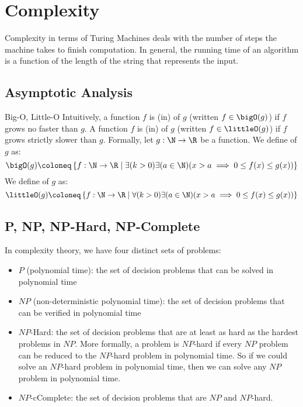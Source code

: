 \chapter{Complexity}

Complexity in terms of Turing Machines deals with the number of steps the machine takes to finish computation. In general, the running time of an algorithm is a function of the length of the string that represents the input.

\section{Asymptotic Analysis}

\begin{dfnbox}{Big-O, Little-O}{}
    Intuitively, a function $f$ is (in)  of $g$ (written $f \in \bigO(g)$) if $f$ grows no faster than $g$. A function $f$ is (in)  of $g$ (written $f \in \littleO(g)$) if $f$ grows strictly slower than $g$.
    \tcblower
    Formally, let $g : \N \to \R$ be a function. We define  of $g$ as:
    \[ \bigO(g) \coloneq \left\{ f : \N \to \R \mid \exists (k > 0) \exists (a \in \N) (x > a \implies 0 \leq f(x) \leq g(x)) \right\} \]
    We define  of $g$ as:
    \[ \littleO(g) \coloneq \left\{ f : \N \to \R \mid \forall (k > 0) \exists (a \in \N) (x > a \implies 0 \leq f(x) \leq g(x)) \right\} \]
\end{dfnbox}

\section{P, NP, NP-Hard, NP-Complete}

In complexity theory, we have four distinct sets of problems:
\begin{itemize}
    \item $P$ (polynomial time): the set of decision problems that can be solved in polynomial time
    \item $NP$ (non-deterministic polynomial time): the set of decision problems that can be verified in polynomial time
    \item $NP$-Hard: the set of decision problems that are at least as hard as the hardest problems in $NP$. More formally, a problem is $NP$-hard if every $NP$ problem can be reduced to the $NP$-hard problem in polynomial time. So if we could solve an $NP$-hard problem in polynomial time, then we can solve any $NP$ problem in polynomial time.
    \item $NP$-cComplete: the set of decision problems that are $NP$ and $NP$-hard. 
\end{itemize}

